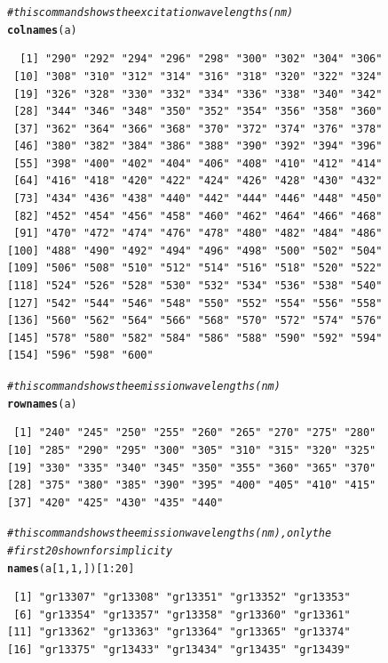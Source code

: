 \documentclass[a4paper,11pt]{article}\usepackage[]{graphicx}\usepackage[]{color}
\makeatletter
\newcommand{\hlnum}[1]{\textcolor[rgb]{0.686,0.059,0.569}{#1}}%
\newcommand{\hlcom}[1]{\textcolor[rgb]{0.678,0.584,0.686}{\textit{#1}}}%
\newcommand{\hlopt}[1]{\textcolor[rgb]{0,0,0}{#1}}%
\newcommand{\hlstd}[1]{\textcolor[rgb]{0.345,0.345,0.345}{#1}}%
\newcommand{\hlkwd}[1]{\textcolor[rgb]{0.737,0.353,0.396}{\textbf{#1}}}%
\newenvironment{kframe}{%
 \def\at@end@of@kframe{}%
 \ifinner\ifhmode%
  \def\at@end@of@kframe{\end{minipage}}%
  \begin{minipage}{\columnwidth}%
 \fi\fi%
 \def\FrameCommand##1{\hskip\@totalleftmargin \hskip-\fboxsep
 \colorbox{shadecolor}{##1}\hskip-\fboxsep
     \hskip-\linewidth \hskip-\@totalleftmargin \hskip\columnwidth}%
 \MakeFramed {\advance\hsize-\width
   \@totalleftmargin\z@ \linewidth\hsize
   \@setminipage}}%
 {\par\unskip\endMakeFramed%
 \at@end@of@kframe}
\newenvironment{knitrout}{}{} %
\makeatother
\begin{document}
\begin{knitrout}
\color{fgcolor}\begin{kframe}
\begin{alltt}
\hlcom{# this command shows the excitation wavelengths (nm)}
\hlkwd{colnames}\hlstd{(a)}
\end{alltt}
\begin{verbatim}
  [1] "290" "292" "294" "296" "298" "300" "302" "304" "306"
 [10] "308" "310" "312" "314" "316" "318" "320" "322" "324"
 [19] "326" "328" "330" "332" "334" "336" "338" "340" "342"
 [28] "344" "346" "348" "350" "352" "354" "356" "358" "360"
 [37] "362" "364" "366" "368" "370" "372" "374" "376" "378"
 [46] "380" "382" "384" "386" "388" "390" "392" "394" "396"
 [55] "398" "400" "402" "404" "406" "408" "410" "412" "414"
 [64] "416" "418" "420" "422" "424" "426" "428" "430" "432"
 [73] "434" "436" "438" "440" "442" "444" "446" "448" "450"
 [82] "452" "454" "456" "458" "460" "462" "464" "466" "468"
 [91] "470" "472" "474" "476" "478" "480" "482" "484" "486"
[100] "488" "490" "492" "494" "496" "498" "500" "502" "504"
[109] "506" "508" "510" "512" "514" "516" "518" "520" "522"
[118] "524" "526" "528" "530" "532" "534" "536" "538" "540"
[127] "542" "544" "546" "548" "550" "552" "554" "556" "558"
[136] "560" "562" "564" "566" "568" "570" "572" "574" "576"
[145] "578" "580" "582" "584" "586" "588" "590" "592" "594"
[154] "596" "598" "600"
\end{verbatim}
\begin{alltt}
\hlcom{# this command shows the emission wavelengths (nm)}
\hlkwd{rownames}\hlstd{(a)}
\end{alltt}
\begin{verbatim}
 [1] "240" "245" "250" "255" "260" "265" "270" "275" "280"
[10] "285" "290" "295" "300" "305" "310" "315" "320" "325"
[19] "330" "335" "340" "345" "350" "355" "360" "365" "370"
[28] "375" "380" "385" "390" "395" "400" "405" "410" "415"
[37] "420" "425" "430" "435" "440"
\end{verbatim}
\begin{alltt}
\hlcom{# this command shows the emission wavelengths (nm), only the}
\hlcom{# first 20 shown for simplicity}
\hlkwd{names}\hlstd{(a[}\hlnum{1}\hlstd{,} \hlnum{1}\hlstd{, ])[}\hlnum{1}\hlopt{:}\hlnum{20}\hlstd{]}
\end{alltt}
\begin{verbatim}
 [1] "gr13307" "gr13308" "gr13351" "gr13352" "gr13353"
 [6] "gr13354" "gr13357" "gr13358" "gr13360" "gr13361"
[11] "gr13362" "gr13363" "gr13364" "gr13365" "gr13374"
[16] "gr13375" "gr13433" "gr13434" "gr13435" "gr13439"
\end{verbatim}
\end{kframe}
\end{knitrout}
\end{document}
